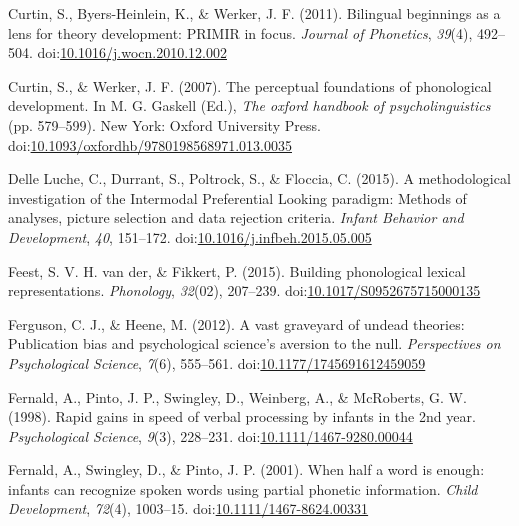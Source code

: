 \documentclass[man]{apa6}
\begin{document}
\leavevmode\hypertarget{ref-Curtin2011}{}%
Curtin, S., Byers-Heinlein, K., \& Werker, J. F. (2011). Bilingual beginnings as a lens for theory development: PRIMIR in focus. \emph{Journal of Phonetics}, \emph{39}(4), 492--504. doi:\href{https://doi.org/10.1016/j.wocn.2010.12.002}{10.1016/j.wocn.2010.12.002}

\leavevmode\hypertarget{ref-Curtin2007}{}%
Curtin, S., \& Werker, J. F. (2007). The perceptual foundations of phonological development. In M. G. Gaskell (Ed.), \emph{The oxford handbook of psycholinguistics} (pp. 579--599). New York: Oxford University Press. doi:\href{https://doi.org/10.1093/oxfordhb/9780198568971.013.0035}{10.1093/oxfordhb/9780198568971.013.0035}

\leavevmode\hypertarget{ref-DelleLuche2015}{}%
Delle Luche, C., Durrant, S., Poltrock, S., \& Floccia, C. (2015). A methodological investigation of the Intermodal Preferential Looking paradigm: Methods of analyses, picture selection and data rejection criteria. \emph{Infant Behavior and Development}, \emph{40}, 151--172. doi:\href{https://doi.org/10.1016/j.infbeh.2015.05.005}{10.1016/j.infbeh.2015.05.005}

\leavevmode\hypertarget{ref-vanderFeest2015}{}%
Feest, S. V. H. van der, \& Fikkert, P. (2015). Building phonological lexical representations. \emph{Phonology}, \emph{32}(02), 207--239. doi:\href{https://doi.org/10.1017/S0952675715000135}{10.1017/S0952675715000135}

\leavevmode\hypertarget{ref-Ferguson2012}{}%
Ferguson, C. J., \& Heene, M. (2012). A vast graveyard of undead theories: Publication bias and psychological science's aversion to the null. \emph{Perspectives on Psychological Science}, \emph{7}(6), 555--561. doi:\href{https://doi.org/10.1177/1745691612459059}{10.1177/1745691612459059}

\leavevmode\hypertarget{ref-Fernald1998}{}%
Fernald, A., Pinto, J. P., Swingley, D., Weinberg, A., \& McRoberts, G. W. (1998). Rapid gains in speed of verbal processing by infants in the 2nd year. \emph{Psychological Science}, \emph{9}(3), 228--231. doi:\href{https://doi.org/10.1111/1467-9280.00044}{10.1111/1467-9280.00044}

\leavevmode\hypertarget{ref-Fernald2001a}{}%
Fernald, A., Swingley, D., \& Pinto, J. P. (2001). When half a word is enough: infants can recognize spoken words using partial phonetic information. \emph{Child Development}, \emph{72}(4), 1003--15. doi:\href{https://doi.org/10.1111/1467-8624.00331}{10.1111/1467-8624.00331}
\end{document}
